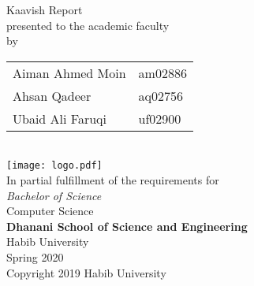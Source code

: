 \begin{titlepage}
  
  \begin{center}
    \vfill
    \textbf{\Huge \Title}
    \bigskip

    {\large Kaavish Report\\
      presented to the academic faculty\\
      by\\\bigskip
      \begin{tabular}{ll}
        Aiman Ahmed Moin & am02886\\
        Ahsan Qadeer & aq02756\\
        Ubaid Ali Faruqi & uf02900\\
      \end{tabular}
    }\\\vfill
    \texttt{[image: logo.pdf]}\\
    {\large In partial fulfillment of the requirements for\\
      \textit{Bachelor of Science}\\
      Computer Science\\\medskip
      \textbf{Dhanani School of Science and Engineering}\\\medskip
      Habib University\\\smallskip
      Spring 2020
    }\\\vfill
    Copyright {\scriptsize \textcopyright} 2019 Habib University
  \end{center}
  \restoregeometry
\end{titlepage}

